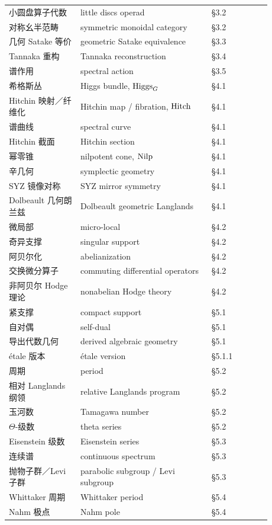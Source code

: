 \begin{center}
\begin{longtable}{@{}>{\raggedright\arraybackslash}p{0.24\linewidth}>{\raggedright\arraybackslash}p{0.44\linewidth}>{\raggedright\arraybackslash}p{0.20\linewidth}@{}}
小圆盘算子代数 & little discs operad & §3.2 \\
对称幺半范畴 & symmetric monoidal category & §3.2 \\
几何 Satake 等价 & geometric Satake equivalence & §3.3 \\
Tannaka 重构 & Tannaka reconstruction & §3.4 \\
谱作用 & spectral action & §3.5 \\
希格斯丛 & Higgs bundle, $\operatorname{Higgs}_{G}$ & §4.1 \\
Hitchin 映射／纤维化 & Hitchin map / fibration, $\operatorname{Hitch}$ & §4.1 \\
谱曲线 & spectral curve & §4.1 \\
Hitchin 截面 & Hitchin section & §4.1 \\
幂零锥 & nilpotent cone, $\operatorname{Nilp}$ & §4.1 \\
辛几何 & symplectic geometry & §4.1 \\
SYZ 镜像对称 & SYZ mirror symmetry & §4.1 \\
Dolbeault 几何朗兰兹 & Dolbeault geometric Langlands & §4.1 \\
微局部 & micro-local & §4.2 \\
奇异支撑 & singular support & §4.2 \\
阿贝尔化 & abelianization & §4.2 \\
交换微分算子 & commuting differential operators & §4.2 \\
非阿贝尔 Hodge 理论 & nonabelian Hodge theory & §4.2 \\
紧支撑 & compact support & §5.1 \\
自对偶 & self-dual & §5.1 \\
导出代数几何 & derived algebraic geometry & §5.1 \\
étale 版本 & étale version & §5.1.1 \\
周期 & period & §5.2 \\
相对 Langlands 纲领 & relative Langlands program & §5.2 \\
玉河数 & Tamagawa number & §5.2 \\
$\Theta$-级数 & theta series & §5.2 \\
Eisenstein 级数 & Eisenstein series & §5.3 \\
连续谱 & continuous spectrum & §5.3 \\
抛物子群／Levi 子群 & parabolic subgroup / Levi subgroup & §5.3 \\
Whittaker 周期 & Whittaker period & §5.4 \\
Nahm 极点 & Nahm pole & §5.4 \\

\end{longtable}
\end{center}

